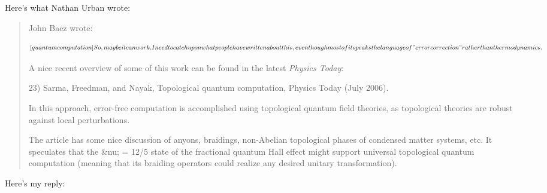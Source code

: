 Here's what Nathan Urban wrote:

\begin{quote}
John Baez wrote:


$$

 [quantum computation]
 So, maybe it can work.  I need to catch up on what people 
 have written about this, even though most of it speaks the 
 language of "error correction" rather than thermodynamics.
$$
    

A nice recent overview of some of this work can be found in the 
latest \emph{Physics Today}:

23) Sarma, Freedman, and Nayak, Topological quantum
computation, Physics Today (July 2006).

In this approach, error-free computation is accomplished using
topological quantum field theories, as topological theories are robust
against local perturbations.

The article has some nice discussion of anyons, braidings, non-Abelian
topological phases of condensed matter systems, etc.  It speculates
that the &nu; = 12/5 state of the fractional quantum Hall effect might
support universal topological quantum computation (meaning that its
braiding operators could realize any desired unitary transformation).
\end{quote}

Here's my reply:

